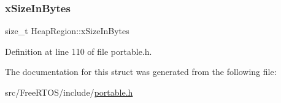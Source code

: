\subsubsection{\texorpdfstring{x\+Size\+In\+Bytes}{xSizeInBytes}}
{\footnotesize\ttfamily size\+\_\+t Heap\+Region\+::x\+Size\+In\+Bytes}



Definition at line 110 of file portable.\+h.



The documentation for this struct was generated from the following file\+:\begin{DoxyCompactItemize}
\item 
src/\+Free\+R\+T\+O\+S/include/\hyperlink{portable_8h}{portable.\+h}\end{DoxyCompactItemize}
